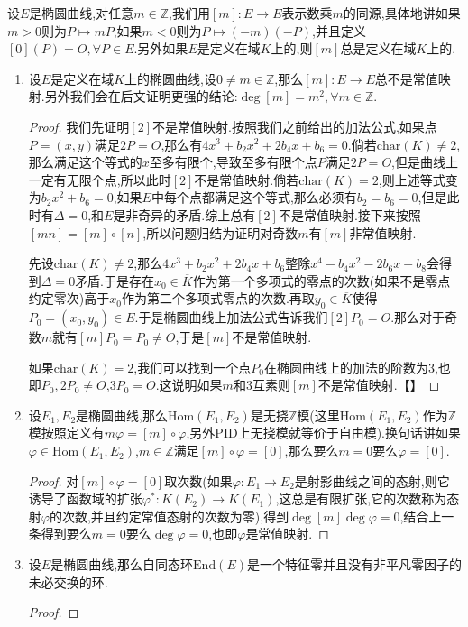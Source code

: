 设$E$是椭圆曲线,对任意$m\in\mathbb{Z}$,我们用$[m]:E\to E$表示数乘$m$的同源,具体地讲如果$m>0$则为$P\mapsto mP$,如果$m<0$则为$P\mapsto(-m)(-P)$,并且定义$[0](P)=O,\forall P\in E$.另外如果$E$是定义在域$K$上的,则$[m]$总是定义在域$K$上的.
\begin{enumerate}
	\item 设$E$是定义在域$K$上的椭圆曲线,设$0\not=m\in\mathbb{Z}$,那么$[m]:E\to E$总不是常值映射.另外我们会在后文证明更强的结论:$\deg[m]=m^2,\forall m\in\mathbb{Z}$.
	\begin{proof}
		
		我们先证明$[2]$不是常值映射.按照我们之前给出的加法公式,如果点$P=(x,y)$满足$2P=O$,那么有$4x^3+b_2x^2+2b_4x+b_6=0$.倘若$\mathrm{char}(K)\not=2$,那么满足这个等式的$x$至多有限个,导致至多有限个点$P$满足$2P=O$,但是曲线上一定有无限个点,所以此时$[2]$不是常值映射.倘若$\mathrm{char}(K)=2$,则上述等式变为$b_2x^2+b_6=0$,如果$E$中每个点都满足这个等式,那么必须有$b_2=b_6=0$,但是此时有$\Delta=0$,和$E$是非奇异的矛盾.综上总有$[2]$不是常值映射.接下来按照$[mn]=[m]\circ[n]$,所以问题归结为证明对奇数$m$有$[m]$非常值映射.
		
		\qquad
		
		先设$\mathrm{char}(K)\not=2$,那么$4x^3+b_2x^2+2b_4x+b_6$整除$x^4-b_4x^2-2b_6x-b_8$会得到$\Delta=0$矛盾.于是存在$x_0\in\overline{K}$作为第一个多项式的零点的次数(如果不是零点约定零次)高于$x_0$作为第二个多项式零点的次数.再取$y_0\in\overline{K}$使得$P_0=(x_0,y_0)\in E$.于是椭圆曲线上加法公式告诉我们$[2]P_0=O$.那么对于奇数$m$就有$[m]P_0=P_0\not=O$,于是$[m]$不是常值映射.
		
		\qquad
		
		如果$\mathrm{char}(K)=2$,我们可以找到一个点$P_0$在椭圆曲线上的加法的阶数为3,也即$P_0,2P_0\not=O$,$3P_0=O$.这说明如果$m$和3互素则$[m]$不是常值映射.【】
	\end{proof}
	\item 设$E_1,E_2$是椭圆曲线,那么$\mathrm{Hom}(E_1,E_2)$是无挠$\mathbb{Z}$模(这里$\mathrm{Hom}(E_1,E_2)$作为$\mathbb{Z}$模按照定义有$m\varphi=[m]\circ\varphi$,另外PID上无挠模就等价于自由模).换句话讲如果$\varphi\in\mathrm{Hom}(E_1,E_2)$,$m\in\mathbb{Z}$满足$[m]\circ\varphi=[0]$,那么要么$m=0$要么$\varphi=[0]$.
	\begin{proof}
		
		对$[m]\circ\varphi=[0]$取次数(如果$\varphi:E_1\to E_2$是射影曲线之间的态射,则它诱导了函数域的扩张$\varphi^*:K(E_2)\to K(E_1)$,这总是有限扩张,它的次数称为态射$\varphi$的次数,并且约定常值态射的次数为零),得到$\deg[m]\deg\varphi=0$,结合上一条得到要么$m=0$要么$\deg\varphi=0$,也即$\varphi$是常值映射.
	\end{proof}
	\item 设$E$是椭圆曲线,那么自同态环$\mathrm{End}(E)$是一个特征零并且没有非平凡零因子的未必交换的环.
	\begin{proof}
		

\end{proof}
\end{enumerate}
